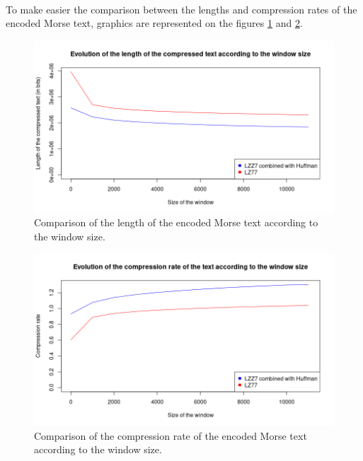 \documentclass[a4paper, 11pt, oneside]{article}
\begin{document}
\paragraph{}To make easier the comparison between the lengths and compression rates of the encoded Morse text, graphics are represented on the figures \ref{fig:length_comparison} and \ref{fig:compression_rate_comparison}.

\begin{figure}[H]
\center
    \includegraphics[scale=0.65]{length_comparison.png}
    \caption{Comparison of the length of the encoded Morse text according to the window size.}
    \label{fig:length_comparison}
    \end{figure}

\begin{figure}[H]
    \center
    \includegraphics[scale=0.65]{compression_rate_comparison.png}
    \caption{Comparison of the compression rate of the encoded Morse text according to the window size.}
    \label{fig:compression_rate_comparison}
    \end{figure}
\end{document}
